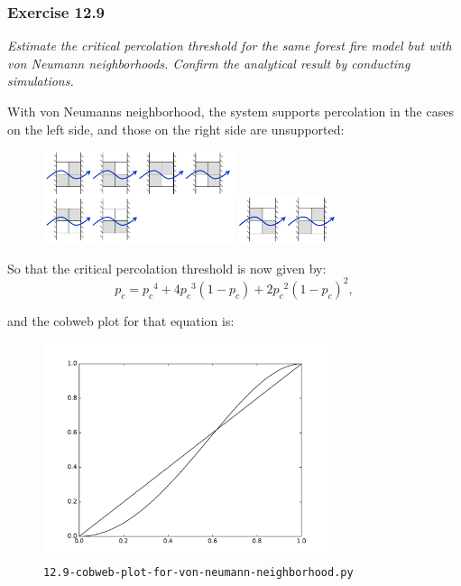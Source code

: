 
\subsubsection*{Exercise 12.9}

\textit{Estimate the critical percolation threshold for the same forest fire
model but with von Neumann neighborhoods. Confirm the analytical result by
conducting simulations.}

\vspace{5mm}
With von Neumann\textquotesingle s neighborhood, the system supports percolation
in the cases on the left side, and those on the right side are unsupported:
\begin{figure}[h]
  \centering
  \includegraphics[width=0.5\textwidth]{./figures/12.9-supported-cases.png}
  \hspace{15mm}
  \includegraphics[width=0.25\textwidth]{./figures/12.9-unsupported-cases.png}
\end{figure}

So that the critical percolation threshold is now given by:
\begin{equation}
  p_c = {p_c}^4 + 4 {p_c}^3 (1-p_c) + 2 {p_c}^2 {(1-p_c)}^2,
\end{equation}

and the cobweb plot for that equation is:
\begin{figure}[h]
  \centering
  \includegraphics[width=0.75\textwidth]{./figures/12.9-cobweb-plot-for-von-neumann-neighborhood.pdf}
  \caption{\texttt{12.9-cobweb-plot-for-von-neumann-neighborhood.py}}
\end{figure}

